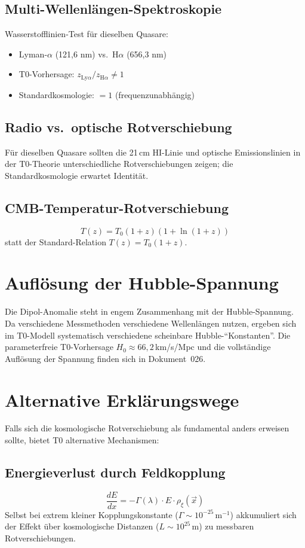 	\subsection{Multi-Wellenlängen-Spektroskopie}

	Wasserstofflinien-Test für dieselben Quasare:
	\begin{itemize}
		\item Lyman-$\alpha$ (121,6 nm) vs.\ H$\alpha$ (656,3 nm)
		\item T0-Vorhersage: $z_{\mathrm{Ly}\alpha} / z_{\mathrm{H}\alpha} \neq 1$
		\item Standardkosmologie: $= 1$ (frequenzunabhängig)
	\end{itemize}

	\subsection{Radio vs.\ optische Rotverschiebung}
	Für dieselben Quasare sollten die 21\,cm HI-Linie und optische Emissionslinien in der T0-Theorie unterschiedliche Rotverschiebungen zeigen; die Standardkosmologie erwartet Identität.

	\subsection{CMB-Temperatur-Rotverschiebung}
	$$T(z) = T_0(1+z)(1+\ln(1+z))$$
	statt der Standard-Relation $T(z) = T_0(1+z)$.

\section{Auflösung der Hubble-Spannung}

	Die Dipol-Anomalie steht in engem Zusammenhang mit der Hubble-Spannung. Da verschiedene Messmethoden verschiedene Wellenlängen nutzen, ergeben sich im T0-Modell systematisch verschiedene scheinbare Hubble-``Konstanten''. Die parameterfreie T0-Vorhersage $H_0 \approx 66{,}2\,$km/s/Mpc und die vollständige Auflösung der Spannung finden sich in Dokument~026.

\section{Alternative Erklärungswege}

	Falls sich die kosmologische Rotverschiebung als fundamental anders erweisen sollte, bietet T0 alternative Mechanismen:

	\subsection{Energieverlust durch Feldkopplung}
	\begin{equation}
		\frac{dE}{dx} = -\Gamma(\lambda) \cdot E \cdot \rho_\xi(\vec{x})
	\end{equation}
	Selbst bei extrem kleiner Kopplungskonstante ($\Gamma \sim 10^{-25}\,\text{m}^{-1}$) akkumuliert sich der Effekt über kosmologische Distanzen ($L \sim 10^{25}\,$m) zu messbaren Rotverschiebungen.

